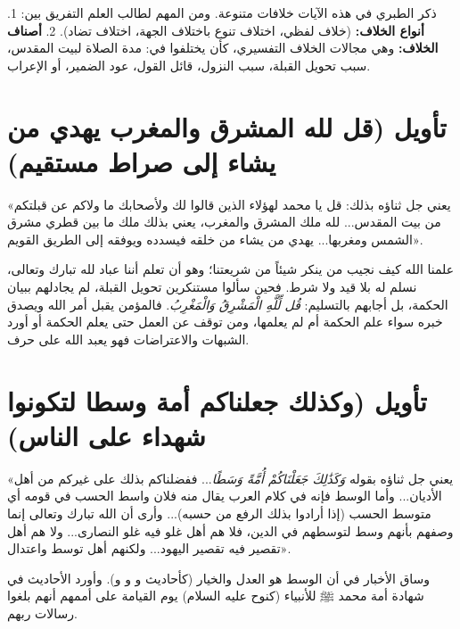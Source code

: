 \begin{fawaid}
ذكر الطبري في هذه الآيات خلافات متنوعة. ومن المهم لطالب العلم التفريق بين:
1. \textbf{أنواع الخلاف:} (خلاف لفظي، اختلاف تنوع باختلاف الجهة، اختلاف تضاد).
2. \textbf{أصناف الخلاف:} وهي مجالات الخلاف التفسيري، كأن يختلفوا في: مدة الصلاة لبيت المقدس، سبب تحويل القبلة، سبب النزول، قائل القول، عود الضمير، أو الإعراب.
\end{fawaid}

\separator

\section{تأويل (قل لله المشرق والمغرب يهدي من يشاء إلى صراط مستقيم)}
 «يعني جل ثناؤه بذلك: قل يا محمد لهؤلاء الذين قالوا لك ولأصحابك ما ولاكم عن قبلتكم من بيت المقدس... لله ملك المشرق والمغرب، يعني بذلك ملك ما بين قطري مشرق الشمس ومغربها... يهدي من يشاء من خلقه فيسدده ويوفقه إلى الطريق القويم».

\begin{fawaid}
علمنا الله كيف نجيب من ينكر شيئاً من شريعتنا؛ وهو أن تعلم أننا عباد لله تبارك وتعالى، نسلم له بلا قيد ولا شرط. فحين سألوا مستنكرين تحويل القبلة، لم يجادلهم ببيان الحكمة، بل أجابهم بالتسليم: \textit{قُل لِّلَّهِ الْمَشْرِقُ وَالْمَغْرِبُ}. فالمؤمن يقبل أمر الله ويصدق خبره سواء علم الحكمة أم لم يعلمها، ومن توقف عن العمل حتى يعلم الحكمة أو أورد الشبهات والاعتراضات فهو يعبد الله على حرف.
\end{fawaid}

\separator

\section{تأويل (وكذلك جعلناكم أمة وسطا لتكونوا شهداء على الناس)}
 «يعني جل ثناؤه بقوله \textit{وَكَذَٰلِكَ جَعَلْنَاكُمْ أُمَّةً وَسَطًا}... ففضلناكم بذلك على غيركم من أهل الأديان... وأما الوسط فإنه في كلام العرب يقال منه فلان واسط الحسب في قومه أي متوسط الحسب (إذا أرادوا بذلك الرفع من حسبه)... وأرى أن الله تبارك وتعالى إنما وصفهم بأنهم وسط لتوسطهم في الدين، فلا هم أهل غلو فيه غلو النصارى... ولا هم أهل تقصير فيه تقصير اليهود... ولكنهم أهل توسط واعتدال».

وساق الأخبار في أن الوسط هو العدل والخيار (كأحاديث  و و و). وأورد  الأحاديث في شهادة أمة محمد ﷺ للأنبياء (كنوح عليه السلام) يوم القيامة على أممهم أنهم بلغوا رسالات ربهم.

